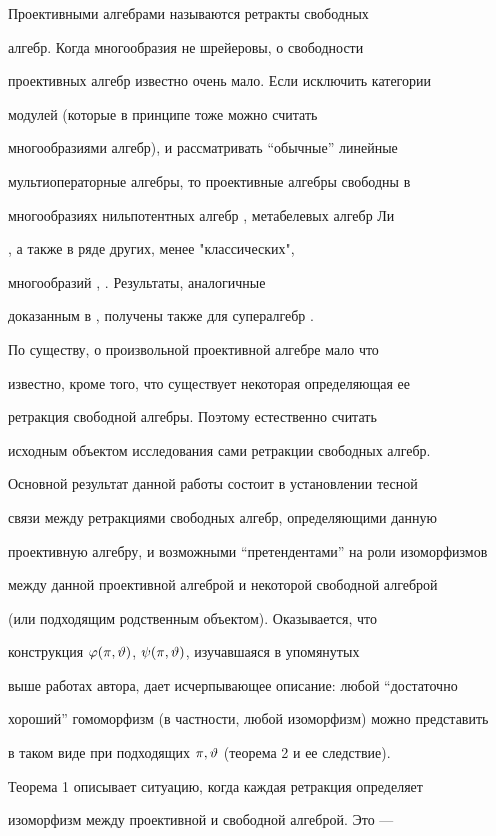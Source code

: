 Проективными алгебрами называются ретракты свободных


алгебр. Когда многообразия не шрейеровы, о свободности


проективных алгебр известно очень мало. Если исключить категории


модулей (которые в принципе тоже можно считать


многообразиями алгебр), и рассматривать ``обычные'' линейные


мультиоператорные алгебры, то проективные алгебры свободны в


многообразиях нильпотентных алгебр \cite{A1}, метабелевых алгебр Ли


\cite{A2}, а также в ряде других, менее "классических",


многообразий \cite{T5}, \cite{T6}. Результаты, аналогичные


доказанным в \cite{A1}, получены также для супералгебр \cite{A3}.





По существу, о произвольной проективной алгебре мало что


известно, кроме того, что существует некоторая определяющая ее


ретракция свободной алгебры. Поэтому естественно считать


исходным объектом исследования сами ретракции свободных алгебр.


Основной результат данной работы состоит в установлении тесной


связи между ретракциями свободных алгебр, определяющими данную


проективную алгебру, и возможными ``претендентами'' на роли изоморфизмов


между данной проективной алгеброй и некоторой свободной алгеброй


(или подходящим родственным объектом). Оказывается, что


конструкция $\varphi(\pi,\vartheta)$, $\psi(\pi,\vartheta)$, изучавшаяся в упомянутых


выше работах автора, дает исчерпывающее описание: любой ``достаточно


хороший'' гомоморфизм (в частности, любой изоморфизм) можно представить


в таком виде при подходящих $\pi,\vartheta$ (теорема 2 и ее следствие).


Теорема 1 описывает ситуацию, когда каждая ретракция определяет


изоморфизм между проективной и свободной алгеброй. Это ---


